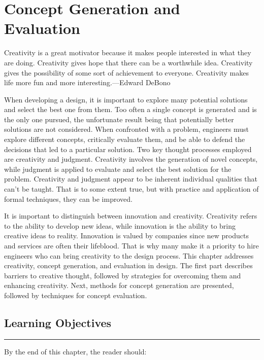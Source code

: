 \chapter{Concept Generation and Evaluation}
\graphicspath{ {./chapter04/Fig} }

\begin{itquote}
Creativity is a great motivator because it makes people interested in
what they are doing. Crea­tivity gives hope that there can be a
worthwhile idea. Creativity gives the possibility of some sort of
achievement to everyone. Creativity makes life more fun and more
interesting.---Edward DeBono
\end{itquote}

When developing a design, it is important to explore many potential
solutions and select the best one from them. Too often a single concept
is generated and is the only one pursued, the unfortunate result being
that potentially better solutions are not considered. When confronted
with a problem, engineers must explore different concepts, critically
evaluate them, and be able to defend the decisions that led to a
particular solution. Two key thought processes employed are creativity
and judgment. Creativity involves the generation of novel con­cepts,
while judgment is applied to evaluate and select the best solution for
the problem. Creativity and judgment appear to be inherent individual
qualities that can't be taught. That is to some extent true, but with
practice and application of formal techniques, they can be im­proved.

It is important to distinguish between innovation and creativity.
Creativity refers to the ability to develop new ideas, while innovation
is the ability to bring creative ideas to reality. Innovation is valued
by companies since new products and services are often their life­blood.
That is why many make it a priority to hire engineers who can bring
creativity to the design process. This chapter addresses creativity,
concept generation, and evaluation in design. The first part describes
barriers to creative thought, followed by strategies for overcoming them
and enhancing creativity. Next, methods for concept generation are
presented, followed by techniques for concept evaluation.

\section*{Learning Objectives}
\noindent\rule{\linewidth}{1pt}
By the end of this chapter, the reader should:

